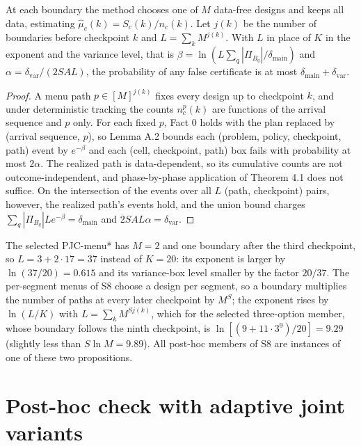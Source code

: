 \documentclass[sigconf,anonymous,review]{acmart}
\newcommand{\dmain}{\delta_{\text{main}}}
\newcommand{\dvar}{\delta_{\text{var}}}
\begin{document}
\begin{proposition}\label{prop:pjcmenu}
At each boundary the method chooses one of $M$ data-free designs and keeps all data, estimating $\hat\mu_c(k) = S_c(k)/n_c(k)$. Let $j(k)$ be the number of boundaries before checkpoint $k$ and $L = \sum_k M^{j(k)}$. With $L$ in place of $K$ in the exponent and the variance level, that is $\beta = \ln(L\sum_q|\Pi_{B_q}|/\dmain)$ and $\alpha = \dvar/(2SAL)$, the probability of any false certificate is at most $\dmain + \dvar$.
\end{proposition}
\begin{proof}
A menu path $p \in [M]^{j(k)}$ fixes every design up to checkpoint $k$, and under deterministic tracking the counts $n^p_c(k)$ are functions of the arrival sequence and $p$ only. For each fixed $p$, Fact 0 holds with the plan replaced by (arrival sequence, $p$), so Lemma A.2 bounds each (problem, policy, checkpoint, path) event by $e^{-\beta}$ and each (cell, checkpoint, path) box fails with probability at most $2\alpha$. The realized path is data-dependent, so its cumulative counts are not outcome-independent, and phase-by-phase application of Theorem 4.1 does not suffice. On the intersection of the events over all $L$ (path, checkpoint) pairs, however, the realized path's events hold, and the union bound charges $\sum_q|\Pi_{B_q}|L e^{-\beta} = \dmain$ and $2SAL\alpha = \dvar$.
\end{proof}

\noindent The selected PJC-menu* has $M = 2$ and one boundary after the third checkpoint, so $L = 3 + 2\cdot 17 = 37$ instead of $K = 20$: its exponent is larger by $\ln(37/20) = 0.615$ and its variance-box level smaller by the factor $20/37$. The per-segment menus of S8 choose a design per segment, so a boundary multiplies the number of paths at every later checkpoint by $M^S$; the exponent rises by $\ln(L/K)$ with $L = \sum_k M^{S j(k)}$, which for the selected three-option member, whose boundary follows the ninth checkpoint, is $\ln[(9 + 11\cdot 3^9)/20] = 9.29$ (slightly less than $S\ln M = 9.89$). All post-hoc members of S8 are instances of one of these two propositions.

\section{Post-hoc check with adaptive joint variants}\label{app:adaptive}
\end{document}
